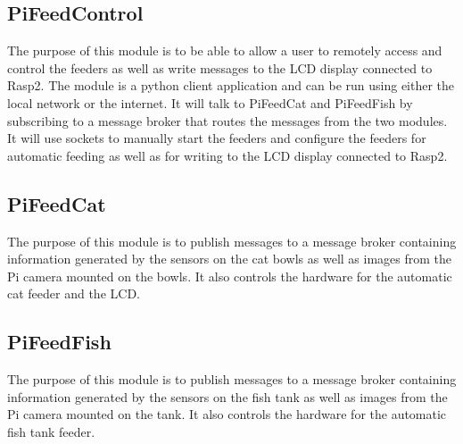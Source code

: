 \subsection{PiFeedControl}
The purpose of this module is to be able to allow a user to remotely access and
control the feeders as well as write messages to the LCD display connected to
Rasp2. The module is a python client application and can be run using either the
local network or the internet. It will talk to PiFeedCat and PiFeedFish by
subscribing to a message broker that routes the messages from the two modules.
It will use sockets to manually start the feeders and configure the feeders for
automatic feeding as well as for writing to the LCD display connected to Rasp2.

\subsection{PiFeedCat}
The purpose of this module is to publish messages to a message broker containing
information generated by the sensors on the cat bowls as well as images from the
Pi camera mounted on the bowls. It also controls the hardware for the automatic
cat feeder and the LCD.

\subsection{PiFeedFish}
The purpose of this module is to publish messages to a message broker containing
information generated by the sensors on the fish tank as well as images from the
Pi camera mounted on the tank. It also controls the hardware for the automatic
fish tank feeder.

